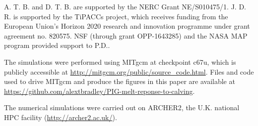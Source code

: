 \documentclass[draft]{agujournal2019}
\begin{document}
%
%

%

%




%
%
%
%
%
%
%
%


\acknowledgments
A. T. B. and D. T. B. are supported by the NERC Grant NE/S010475/1. J. D. R. is supported by the TiPACCs project, which receives funding from the European Union's Horizon 2020 research and innovation programme under grant agreement no. 820575. NSF (through grant OPP-1643285) and the NASA MAP program provided support to P.D..

The simulations were performed using MITgcm at checkpoint c67u, which is publicly accessible at \url{http://mitgcm.org/public/source_code.html}. Files and code used to drive MITgcm and produce the figures in this paper are available at \url{https://github.com/alextbradley/PIG-melt-reponse-to-calving}.

The numerical simulations were carried out on ARCHER2, the U.K. national HPC facility (\url{http://archer2.ac.uk/}).


\end{document}
